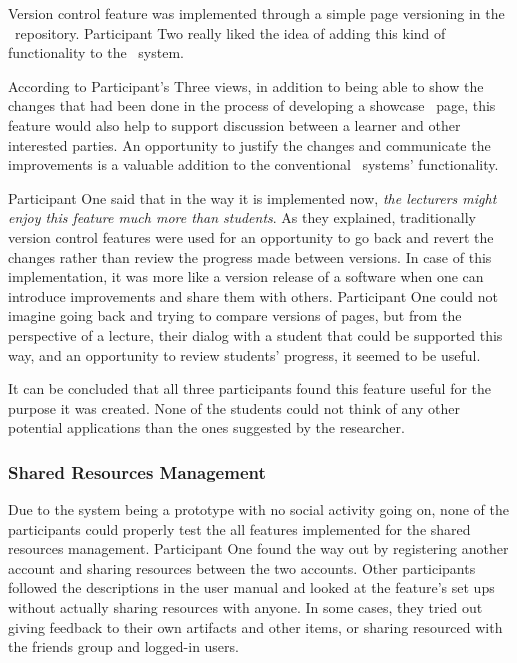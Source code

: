 Version control feature was implemented through a simple page versioning in the
\ep~repository. Participant Two really liked the idea of adding this kind of
functionality to the \ep~system.


According to Participant's Three views, in addition to being able to show the
changes that had been done in the process of developing a showcase \ep~page,
this feature would also help to support discussion between a learner and other
interested parties. An opportunity to justify the changes and communicate the
improvements is a valuable addition to the conventional \ep~systems'
functionality.


Participant One said that in the way it is implemented now, \textit{the
lecturers might enjoy this feature much more than students}. As they explained,
traditionally version control features were used for an opportunity to go
back and revert the changes rather than review the progress made between
versions. In case of this implementation, it was more like a version release of
a software when one can introduce improvements and share them with others.
Participant One could not imagine going back and trying to compare versions of
pages, but from the perspective of a lecture, their dialog with a student
that could be supported this way, and an opportunity to review students'
progress, it seemed to be useful.

It can be concluded that all three participants found this feature useful for
the purpose it was created. None of the students could not think of any other
potential applications than the ones suggested by the researcher.

\subsubsection{Shared Resources Management}

Due to the system being a prototype with no social activity going on, none of
the participants could properly test the all features implemented for the shared
resources management. Participant One found the way out by registering another
account and sharing resources between the two accounts. Other participants
followed the descriptions in the user manual and looked at the feature's set ups
without actually sharing resources with anyone. In some cases, they tried out
giving feedback to their own artifacts and other items, or sharing resourced
with the friends group and logged-in users.

